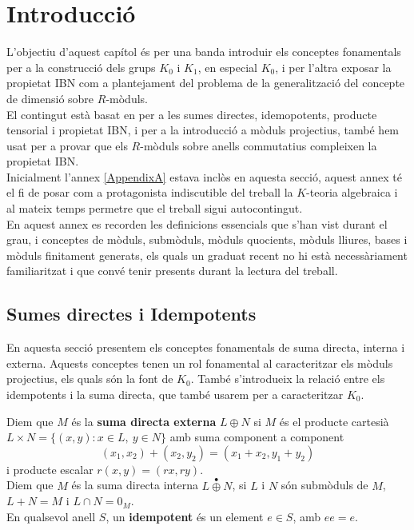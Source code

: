 
\chapter{Introducció} %

L'objectiu d'aquest capítol és per una banda introduir els conceptes fonamentals per a la construcció dels grups $K_0$ i $K_1$, en especial $K_0$, i per l'altra exposar la propietat IBN com a plantejament del problema de la generalització del concepte de dimensió sobre $R$-mòduls. \\
El contingut està basat en {\normalfont [2]} per a les sumes directes, idemopotents, producte tensorial i propietat IBN, i {\normalfont [1]} per a la introducció a mòduls projectius, també hem usat {\normalfont [6]} per a provar que els $R$-mòduls sobre anells commutatius compleixen la propietat IBN.
\\
\indent Inicialment l'annex \ref{AppendixA} estava inclòs en aquesta secció, aquest annex té el fi de posar com a protagonista indiscutible del treball la $K$-teoria algebraica i al mateix temps permetre que el treball sigui autocontingut. \\
En aquest annex es recorden les definicions essencials que s'han vist durant el grau, i conceptes de mòduls, submòduls, mòduls quocients, mòduls lliures, bases i mòduls finitament generats, els quals un graduat recent no hi està necessàriament familiaritzat i que convé tenir presents durant la lectura del treball.
\label{Chapter1} %

\section{Sumes directes i Idempotents}
En aquesta secció presentem els conceptes fonamentals de suma directa, interna i externa. Aquests conceptes tenen un rol fonamental al caracteritzar els mòduls projectius, els quals són la font de $K_0$. També s'introdueix la relació entre els idempotents i la suma directa, que també usarem per a caracteritzar $K_0$.

\begin{definition}
Diem que $M$ és la \textbf{suma directa externa} $L \oplus N$ si $M$ és el producte cartesià $L\times N = \{(x,y) : x\in L, \ y\in N \}$ amb suma component a component $$(x_1,x_2)+(x_2,y_2)=(x_1+x_2,y_1+y_2)$$ i producte escalar $r(x,y)=(rx,ry)$.
\\
\indent Diem que $M$ és la suma directa interna $L\overset{\bullet}{\oplus} N$, si $L$ i $N$ són submòduls de $M$, $L+N=M$ i $L\cap N = {0_M}$.  
\\ \indent
En qualsevol anell $S$, un \textbf{idempotent} és un element $e\in S$, amb $ee=e$. 
\end{definition}

